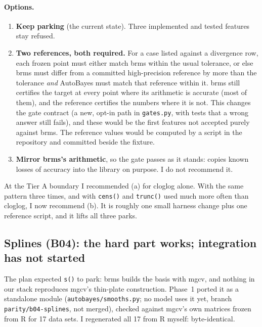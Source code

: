 \documentclass[11pt]{article}
\newcommand{\code}[1]{\texttt{#1}}
\newcommand{\file}[1]{\texttt{#1}}
\begin{document}
\paragraph{Options.}
\begin{enumerate}[label=(\alph*)]
\item \textbf{Keep parking} (the current state). Three implemented and tested features stay refused.
\item \textbf{Two references, both required.} For a case listed against a divergence row, each frozen point must
  either match brms within the usual tolerance, or else brms must differ from a committed high-precision
  reference by more than the tolerance \emph{and} AutoBayes must match that reference within it. brms still certifies
  the target at every point where its arithmetic is accurate (most of them), and the reference certifies the numbers
  where it is not. This changes the gate contract (a new, opt-in path in \file{gates.py}, with tests that a wrong
  answer still fails), and these would be the first features not accepted purely against brms. The reference values
  would be computed by a script in the repository and committed beside the fixture.
\item \textbf{Mirror brms's arithmetic}, so the gate passes as it stands: copies known losses of accuracy into the
  library on purpose. I do not recommend it.
\end{enumerate}
\noindent At the Tier A boundary I recommended (a) for cloglog alone. With the same pattern three times, and with
\code{cens()} and \code{trunc()} used much more often than cloglog, I now recommend (b). It is roughly one small
harness change plus one reference script, and it lifts all three parks.

\subsection*{Splines (B04): the hard part works; integration has not started}

The plan expected \code{s()} to park: brms builds the basis with mgcv, and nothing in our stack reproduces mgcv's
thin-plate construction. Phase~1 ported it as a standalone module (\file{autobayes/smooths.py}; no model uses it yet,
branch \code{parity/b04-splines}, not merged), checked against mgcv's own matrices frozen from R for 17 data sets. I
regenerated all 17 from R myself: byte-identical.
\end{document}
